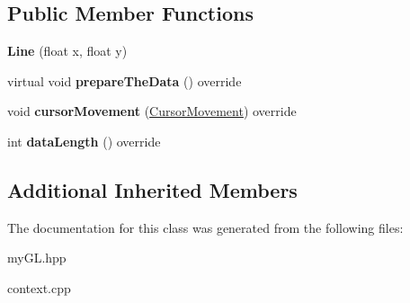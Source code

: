 \subsection*{Public Member Functions}
\begin{DoxyCompactItemize}
\item 
{\bfseries Line} (float x, float y)\hypertarget{classLine_af86eb752cf0f65bd28b3c7f498862a26}{}\label{classLine_af86eb752cf0f65bd28b3c7f498862a26}

\item 
virtual void {\bfseries prepare\+The\+Data} () override\hypertarget{classLine_a344075dff1d956c5a1efe077c775c814}{}\label{classLine_a344075dff1d956c5a1efe077c775c814}

\item 
void {\bfseries cursor\+Movement} (\hyperlink{classCursorMovement}{Cursor\+Movement}) override\hypertarget{classLine_a5eda78277ddb35bc5b34035767e4a063}{}\label{classLine_a5eda78277ddb35bc5b34035767e4a063}

\item 
int {\bfseries data\+Length} () override\hypertarget{classLine_a9d6011bc5bfaa1398b6c84b878d4c391}{}\label{classLine_a9d6011bc5bfaa1398b6c84b878d4c391}

\end{DoxyCompactItemize}
\subsection*{Additional Inherited Members}


The documentation for this class was generated from the following files\+:\begin{DoxyCompactItemize}
\item 
my\+G\+L.\+hpp\item 
context.\+cpp\end{DoxyCompactItemize}
